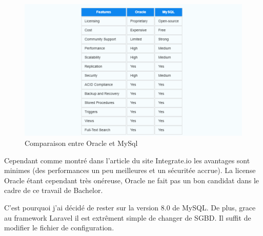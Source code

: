 \begin{center}
    \begin{figure}[H]%
        \includegraphics[width=\textwidth]{./assets/figures/OracleVsMySql.png}
        \caption{Comparaison entre Oracle et MySql \label{OracleVsMySql.png}}
    \end{figure}
\end{center}
Cependant comme montré dans l'article du site Integrate.io \cite{Integrate.io} les avantages sont minimes (des performances un peu meilleures et un sécuritée accrue). La license Oracle étant cependant très onéreuse, Oracle ne fait pas un bon candidat dans le cadre de ce travail de Bachelor.

C'est pourquoi j'ai décidé de rester sur la version 8.0 de MySQL. De plus, grace au framework Laravel il est extrêment simple de changer de SGBD. Il suffit de modifier le fichier de configuration.

